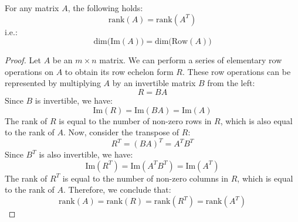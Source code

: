 \begin{theorem}
    For any matrix $A$, the following holds:
    \[
        \text{rank}(A) = \text{rank}(A^T)
    \]
    i.e.:
    \[
        \text{dim(Im}(A)) = \text{dim(Row}(A))
    \]
\end{theorem}
\begin{proof}
    Let $A$ be an $m \times n$ matrix. We can perform a series of elementary row operations on $A$ to obtain its row echelon form $R$. These row operations can be represented by multiplying $A$ by an invertible matrix $B$ from the left:
    \[ R = B A \]
    Since $B$ is invertible, we have:
    \[ \text{Im}(R) = \text{Im}(B A) = \text{Im}(A) \]
    The rank of $R$ is equal to the number of non-zero rows in $R$, which is also equal to the rank of $A$. Now, consider the transpose of $R$:
    \[ R^T = (B A)^T = A^T B^T \]
    Since $B^T$ is also invertible, we have:
    \[ \text{Im}(R^T) = \text{Im}(A^T B^T) = \text{Im}(A^T) \]
    The rank of $R^T$ is equal to the number of non-zero columns in $R$, which is equal to the rank of $A$. Therefore, we conclude that:
    \[ \text{rank}(A) = \text{rank}(R) = \text{rank}(R^T) = \text{rank}(A^T) \]
\end{proof}

